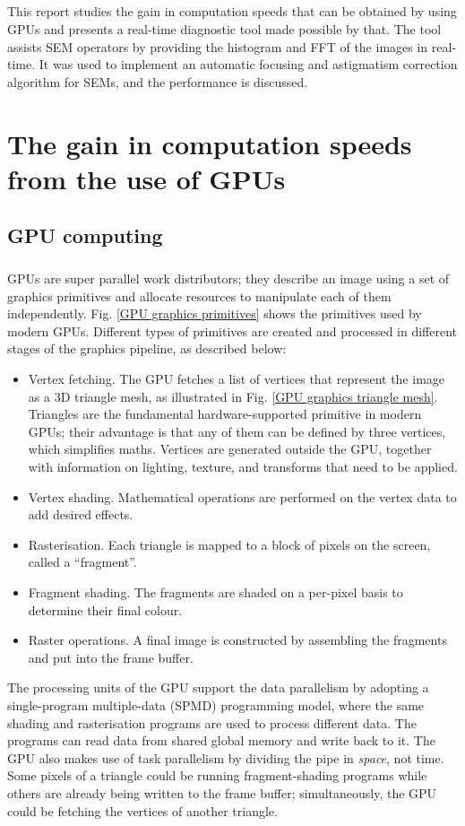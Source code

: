 \documentclass[12pt, twocolumn]{report}
\begin{document}
\paragraph{}
This report studies the gain in computation speeds that can be obtained by using GPUs and presents a real-time diagnostic tool made possible by that. The tool assists SEM operators by providing the histogram and FFT of the images in real-time. It was used to implement an automatic focusing and astigmatism correction algorithm for SEMs, and the performance is discussed.

\chapter{The gain in computation speeds from the use of GPUs}
\section{GPU computing}
\paragraph{}
GPUs are super parallel work distributors; they describe an image using a set of graphics primitives and allocate resources to manipulate each of them independently. Fig. \ref{GPU graphics primitives} shows the primitives used by modern GPUs. Different types of primitives are created and processed in different stages of the graphics pipeline, as described below:
\begin{itemize}
    \item Vertex fetching. The GPU fetches a list of vertices that represent the image as a 3D triangle mesh, as illustrated in Fig. \ref{GPU graphics triangle mesh}. Triangles are the fundamental hardware-supported primitive in modern GPUs; their advantage is that any of them can be defined by three vertices, which simplifies maths. Vertices are generated outside the GPU, together with information on lighting, texture, and transforms that need to be applied.
    \item Vertex shading. Mathematical operations are performed on the vertex data to add desired effects.
    \item Rasterisation. Each triangle is mapped to a block of pixels on the screen, called a ``fragment''.
    \item Fragment shading. The fragments are shaded on a per-pixel basis to determine their final colour.
    \item Raster operations. A final image is constructed by assembling the fragments and put into the frame buffer.
\end{itemize}
The processing units of the GPU support the data parallelism by adopting a single-program multiple-data (SPMD) programming model, where the same shading and rasterisation programs are used to process different data. The programs can read data from shared global memory and write back to it. The GPU also makes use of task parallelism by dividing the pipe in \textit{space}, not time. Some pixels of a triangle could be running fragment-shading programs while others are already being written to the frame buffer; simultaneously, the GPU could be fetching the vertices of another triangle.
\end{document}
